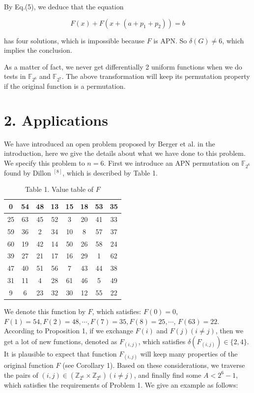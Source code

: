 \documentclass[10pt]{article}
\begin{document}
By Eq.(5), we deduce that the equation

$$
F(x)+F\left(x+\left(a+p_{1}+p_{2}\right)\right)=b
$$

has four solutions, which is impossible because $F$ is APN. So $\delta(G) \neq 6$, which implies the conclusion.

As a matter of fact, we never get differentially 2 uniform functions when we do tests in $\mathbb{F}_{2^{6}}$ and $\mathbb{F}_{2^{7}}$. The above transformation will keep its permutation property if the original function is a permutation.

\section*{2. Applications}
We have introduced an open problem proposed by Berger et al. in the introduction, here we give the details about what we have done to this problem. We specify this problem to $n=6$. First we introduce an APN permutation on $\mathbb{F}_{2^{6}}$ found by Dillon ${ }^{[8]}$, which is described by Table 1.

\begin{table}[h]
\begin{center}
\captionsetup{labelformat=empty}
\caption{Table 1. Value table of $F$}
\begin{tabular}{|c|c|c|c|c|c|c|c|}
\hline
0 & 54 & 48 & 13 & 15 & 18 & 53 & 35 \\
\hline
25 & 63 & 45 & 52 & 3 & 20 & 41 & 33 \\
\hline
59 & 36 & 2 & 34 & 10 & 8 & 57 & 37 \\
\hline
60 & 19 & 42 & 14 & 50 & 26 & 58 & 24 \\
\hline
39 & 27 & 21 & 17 & 16 & 29 & 1 & 62 \\
\hline
47 & 40 & 51 & 56 & 7 & 43 & 44 & 38 \\
\hline
31 & 11 & 4 & 28 & 61 & 46 & 5 & 49 \\
\hline
9 & 6 & 23 & 32 & 30 & 12 & 55 & 22 \\
\hline
\end{tabular}
\end{center}
\end{table}

We denote this function by $F$, which satisfies: $F(0)=0$, $F(1)=54, F(2)=48, \cdots, F(7)=35, F(8)=25, \cdots$, $F(63)=22$. According to Proposition 1, if we exchange $F(i)$ and $F(j)(i \neq j)$, then we get a lot of new functions, denoted as $F_{(i, j)}$, which satisfies $\delta\left(F_{(i, j)}\right) \in\{2,4\}$. It is plausible to expect that function $F_{(i, j)}$ will keep many properties of the original function $F$ (see Corollary 1). Based on these considerations, we traverse the pairs of $(i, j) \in\left(\mathbb{Z}_{2^{6}} \times \mathbb{Z}_{2^{6}}\right)(i \neq j)$, and finally find some $A<2^{6}-1$, which satisfies the requirements of Problem 1. We give an example as follows:
\end{document}

